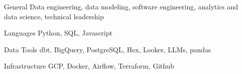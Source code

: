

\begin{cvskills}
  \cvskill
    {General}
    {Data engineering, data modeling, software engineering, analytics and data science, technical leadership}

  \cvskill
    {Languages}
    {Python, SQL, Javascript}

  \cvskill
    {Data Tools}
    {dbt, BigQuery, PostgreSQL, Hex, Looker, LLMs, pandas}

  \cvskill
    {Infrastructure}
    {GCP, Docker, Airflow, Terraform, Github}

\end{cvskills}

